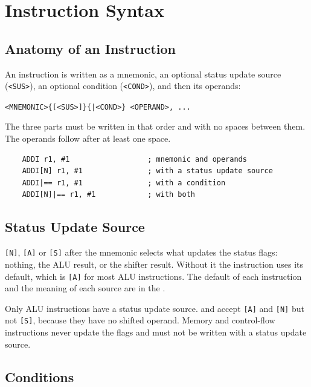 \chapter{Instruction Syntax}
\label{ch:instructions}

\section{Anatomy of an Instruction}

An instruction is written as a mnemonic, an optional status update source (\texttt{<SUS>}), an optional condition
(\texttt{<COND>}), and then its operands:

\begin{center}
	\texttt{<MNEMONIC>\{[<SUS>]\}\{|<COND>\} <OPERAND>, ...}
\end{center}

The three parts must be written in that order and with no spaces between them. The operands follow after at least one
space.

\begin{lstlisting}
    ADDI r1, #1                  ; mnemonic and operands
    ADDI[N] r1, #1               ; with a status update source
    ADDI|== r1, #1               ; with a condition
    ADDI[N]|== r1, #1            ; with both
\end{lstlisting}

\section{Status Update Source}
\label{sec:status-update-syntax}

\texttt{[N]}, \texttt{[A]} or \texttt{[S]} after the mnemonic selects what updates the status flags: nothing, the ALU
result, or the shifter result. Without it the instruction uses its default, which is \texttt{[A]} for most ALU
instructions. The default of each instruction and the meaning of each source are in the \archmanual{}.

Only ALU instructions have a status update source.  and  accept \texttt{[A]} and
\texttt{[N]} but not \texttt{[S]}, because they have no shifted operand. Memory and control-flow instructions never
update the flags and must not be written with a status update source.

\section{Conditions}

